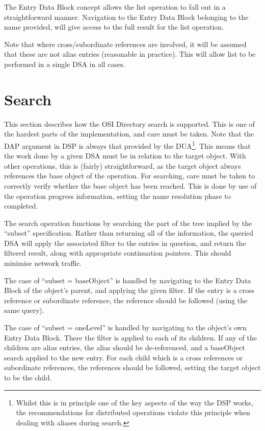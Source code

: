 The Entry Data Block concept allows the list operation to fall out in a
straightforward manner.
Navigation to the Entry Data Block belonging to the name provided, will
give access to the full result for the list operation.

Note that where cross/subordinate references are involved, it will be
assumed that these are not alias entries (reasonable in practice).
This will allow list to be performed in a single DSA in all cases.

\section {Search}

This section describes how the OSI Directory search is supported.  This is
one of the hardest parts of the implementation, and care must be taken.
Note that the DAP argument in DSP is always that provided by the
DUA\footnote {Whilst this is in principle one of the key aspects of the way
the DSP works, the recommendations for distributed operations violate this
principle when dealing with aliases during search.}.  This means that the
work done by a given DSA must be in relation to the target object.  With
other operations, this is (fairly) straightforward, as the target object
always references the base object of the operation.  For searching, care
must be taken to correctly verify whether the base object has been reached.
This is done by use of the operation progress information, setting the name
resolution phase to completed.

The search operation functions by searching the part of the tree implied
by the ``subset'' specification.
Rather than returning all of the information, the queried DSA will apply
the associated filter to the entries in question, and return the
filtered result, along with appropriate continuation pointers.
This should minimise network traffic.


The case of ``subset = baseObject'' is handled by navigating to the Entry
Data Block of the object's parent, and applying the given filter.
If the entry is a cross reference or subordinate reference, the reference
should be followed (using the same query).

The case of ``subset = oneLevel'' is handled by navigating to the object's
own Entry Data Block.
There the filter is applied to each of its children.
If any of the children are alias entries, the alias should be
de-referenced, and a baseObject search applied to the new entry.
For each child which is a cross references or subordinate references, 
the references should be followed, setting the target object to be the child.

